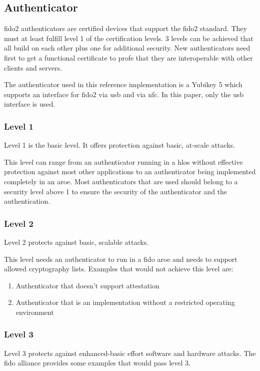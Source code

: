 \documentclass[a4paper, 11pt]{scrartcl}
\begin{document}
\subsection{Authenticator}
\gls{fido2} authenticators are certified devices that support the \gls{fido2} standard. They must at least fulfill level 1 of the certification levels. 3 levels can be achieved that all build on each other plus one for additional security. New authenticators need first to get a functional certificate to profe that they are interoperable with other clients and servers.

The authenticator used in this reference implementation is a Yubikey 5 which supports an interface for \gls{fido2} via \gls{usb} and via \gls{nfc}. In this paper, only the \gls{usb} interface is used.

\subsubsection{Level 1}
Level 1 is the basic level. It offers protection against basic, at-scale attacks. \cite{fido:authenticator:level1}

This level can range from an authenticator running in a \gls{hlos} without effective protection against most other applications to an authenticator being implemented completely in an \gls{aroe}. Most authenticators that are used should belong to a security level above 1 to ensure the security of the authenticator and the authentication. \cite{fido:authenticator:level1}

\subsubsection{Level 2}
Level 2 protects against basic, scalable attacks. \cite{fido:authenticator:level2}

This level needs an authenticator to run in a \gls{fido} \gls{aroe} and needs to support allowed cryptography lists. Examples that would not achieve this level are: \cite{fido:authenticator:level2, fido:authenticator:allowedEnvironment}
\begin{enumerate}
  \item Authenticator that doesn't support attestation
  \item Authenticator that is an implementation without a restricted operating environment 
\end{enumerate}

\subsubsection{Level 3}
Level 3 protects against enhanced-basic effort software and hardware attacks. The fido alliance provides some examples that would pass level 3. \cite{fido:authenticator:level3}
\end{document}
